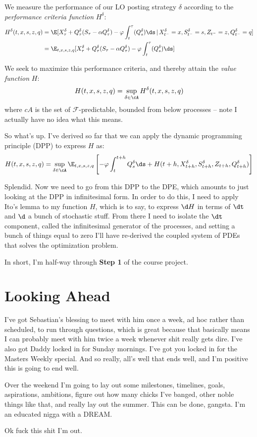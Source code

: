 \documentclass[12pt]{article}
\begin{document}
We measure the performance of our LO posting strategy $\delta$ according to the \textit{performance criteria function} $H^\delta$:
\begin{align*}
H^\delta (t,x,s,z,q) & = \E [ X_\tau^\delta + Q_\tau^\delta(S_\tau - \alpha Q_\tau^\delta) - \varphi \int_t^\tau (Q_s^\delta) \ds \, | \, X_{t^-}^\delta = x, S_{t^-}^\delta = s, Z_{t^-} = z, Q_{t^-}^\delta = q] \\
& = \E_{t,x,s,z,q} [ X_\tau^\delta + Q_\tau^\delta(S_\tau - \alpha Q_\tau^\delta) - \varphi \int_t^\tau (Q_s^\delta) \ds ]
\end{align*} 

We seek to maximize this performance criteria, and thereby attain the \textit{value function} $H$:
\[ H(t,x,s,z,q) = \sup_{\delta \in \cA} H^\delta (t,x,s,z,q) \]
where $cA$ is the set of $\mathcal{F}$-predictable, bounded from below processes -- note I actually have no idea what this means.

So what's up. I've derived so far that we can apply the dynamic programming principle (DPP) to express $H$ as:
\[ H(t,x,s,z,q) = \sup_{\delta \in \cA} \E_{t,x,s,z,q} \left[ -\varphi \int_t^{t+h} Q_s^\delta \ds + H(t+h, X_{t+h}^\delta, S_{t+h}^\delta, Z_{t+h}, Q_{t+h}^\delta) \right] \]

Splendid. Now we need to go from this DPP to the DPE, which amounts to just looking at the DPP in infinitesimal form. In order to do this, I need to apply Ito's lemma to my function $H$, which is to say, to express $\d H$ in terms of $\dt$ and $\d$ a bunch of stochastic stuff. From there I need to isolate the $\dt$ component, called the infinitesimal generator of the processes, and setting a bunch of things equal to zero I'll have re-derived the coupled system of PDEs that solves the optimization problem. 

In short, I'm half-way through \textbf{Step 1} of the course project. 

\section*{Looking Ahead}
I've got Sebastian's blessing to meet with him once a week, ad hoc rather than scheduled, to run through questions, which is great because that basically means I can probably meet with him twice a week whenever shit really gets dire. I've also got Daddy locked in for Sunday mornings. I've got you locked in for the Masters Weekly special. And so really, all's well that ends well, and I'm positive this is going to end well. 

Over the weekend I'm going to lay out some milestones, timelines, goals, aspirations, ambitions, figure out how many chicks I've banged, other noble things like that, and really lay out the summer. This can be done, gangsta. I'm an educated nigga with a DREAM.

Ok fuck this shit I'm out.
\end{document}
